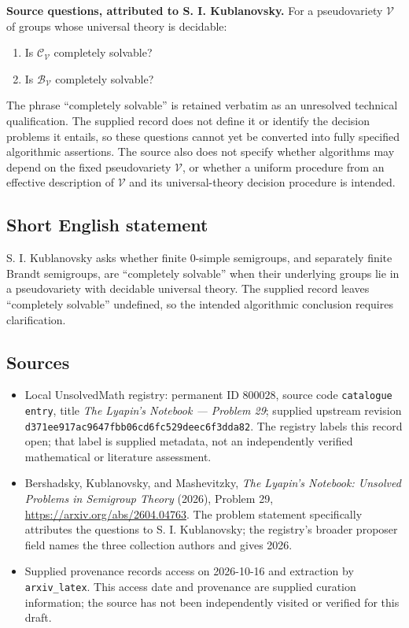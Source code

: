 \documentclass[11pt]{article}
\begin{document}
\textbf{Source questions, attributed to S. I. Kublanovsky.} For a pseudovariety \(\mathcal V\) of groups whose universal theory is decidable:
\begin{enumerate}
\item Is \(\mathcal C_{\mathcal V}\) completely solvable?
\item Is \(\mathcal B_{\mathcal V}\) completely solvable?
\end{enumerate}
The phrase ``completely solvable'' is retained verbatim as an unresolved technical qualification. The supplied record does not define it or identify the decision problems it entails, so these questions cannot yet be converted into fully specified algorithmic assertions. The source also does not specify whether algorithms may depend on the fixed pseudovariety \(\mathcal V\), or whether a uniform procedure from an effective description of \(\mathcal V\) and its universal-theory decision procedure is intended.
\subsection{Short English statement}
S. I. Kublanovsky asks whether finite \(0\)-simple semigroups, and separately finite Brandt semigroups, are ``completely solvable'' when their underlying groups lie in a pseudovariety with decidable universal theory. The supplied record leaves ``completely solvable'' undefined, so the intended algorithmic conclusion requires clarification.
\subsection{Sources}
\begin{itemize}
\item Local UnsolvedMath registry: permanent ID \(800028\), source code \texttt{catalogue entry}, title \emph{The Lyapin's Notebook --- Problem 29}; supplied upstream revision \texttt{d371ee917ac9647fbb06cd6fc529deec6f3dda82}. The registry labels this record open; that label is supplied metadata, not an independently verified mathematical or literature assessment.
\item Bershadsky, Kublanovsky, and Mashevitzky, \emph{The Lyapin's Notebook: Unsolved Problems in Semigroup Theory} (2026), Problem 29, \url{https://arxiv.org/abs/2604.04763}. The problem statement specifically attributes the questions to S. I. Kublanovsky; the registry's broader proposer field names the three collection authors and gives 2026.
\item Supplied provenance records access on 2026-10-16 and extraction by \texttt{arxiv\_latex}. This access date and provenance are supplied curation information; the source has not been independently visited or verified for this draft.
\end{itemize}
\end{document}
